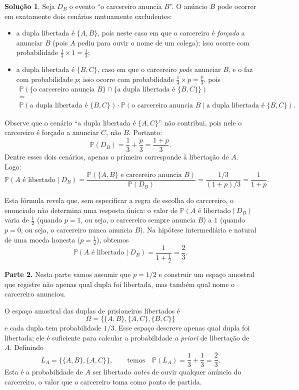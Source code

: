 \documentclass[12pt,portuguese]{article}
\theoremstyle{definition}
\newtheorem*{solution}{Solução}
\begin{document}
\begin{solution}
Seja \(D_B\) o evento ``o carcereiro anuncia \(B\)''. O anúncio \(B\) pode ocorrer em exatamente dois cenários mutuamente excludentes:
\begin{itemize}
  \item a dupla libertada é \(\{A,B\}\), pois neste caso em que o carcereiro 
  é \emph{forçado} a anunciar \(B\) (pois \(A\) pediu para ouvir o nome de um colega); isso ocorre com probabilidade \(\tfrac{1}{3} \times 1 = \tfrac{1}{3}\);
  \item a dupla libertada é \(\{B,C\}\), caso em que o carcereiro \emph{pode} anunciar \(B\), e o faz com probabilidade \(p\); isso ocorre com probabilidade \(\tfrac{1}{3} \times p = \tfrac{p}{3}\), pois
  \[
  \begin{array}{c}
  \mathbb{P}(\{\text{o carcereiro anuncia } B\} \cap \{ \text{a dupla libertada é } \{B,C\} \})
  \\
  =
  \\
  \mathbb{P}(\text{a dupla libertada é } \{B,C\})\cdot
  \mathbb{P}(\text{o carcereiro anuncia } B \mid \text{a dupla libertada é } \{B,C\}).  
  \end{array}
  \]
\end{itemize}
Observe que o cenário ``a dupla libertada é \(\{A,C\}\)'' não contribui, pois nele o carcereiro é forçado a anunciar \(C\), não \(B\). Portanto:
\[
  \mathbb{P}(D_B) = \frac{1}{3} + \frac{p}{3} = \frac{1+p}{3}.
\]
Dentre esses dois cenários, apenas o primeiro corresponde à libertação de \(A\). Logo:
\[
  \mathbb{P}(A\text{ é libertado}\mid D_B)
  = \frac{\mathbb{P}(\{A,B\} \text{ e carcereiro anuncia }B)}{\mathbb{P}(D_B)}
  = \frac{1/3}{(1+p)/3} = \frac{1}{1+p}.
\]

Esta fórmula revela que, sem especificar a regra de escolha do carcereiro, o enunciado não determina uma resposta única: o valor de \(\mathbb{P}(A\text{ é libertado}\mid D_B)\) varia de \(\tfrac{1}{2}\) (quando \(p=1\), ou seja, o carcereiro sempre anuncia \(B\)) a \(1\) (quando \(p=0\), ou seja, o carcereiro nunca anuncia \(B\)). Na hipótese intermediária e natural de uma moeda honesta (\(p=\tfrac{1}{2}\)), obtemos 
\[ 
\mathbb{P}(A\text{ é libertado}\mid D_B) = \frac{1}{1+\frac{1}{2}} = \frac{2}{3}.
\]

\smallskip
\noindent\textbf{Parte 2.} Nesta parte vamos assumir que $p=1/2$  
e construir um espaço amostral que registre não apenas 
qual dupla foi libertada, mas também qual nome o carcereiro anunciou.

O espaço amostral das duplas de prisioneiros libertados é
\[
  \Omega = \{\{A,B\}, \{A,C\}, \{B,C\}\}
\]
e cada dupla tem probabilidade $1/3$. Esse espaço descreve apenas qual dupla foi libertada; 
ele é suficiente para calcular a probabilidade \emph{a priori} de libertação de \(A\). Definindo
\[
  L_A = \{\{A,B\},\{A,C\}\},
  \qquad \text{temos}\quad  \mathbb{P}(L_A) = \frac{1}{3} + \frac{1}{3} = \frac{2}{3}.
\]
Esta é a probabilidade de \(A\) ser libertado \emph{antes} de ouvir qualquer anúncio do carcereiro, 
o valor que o carcereiro toma como ponto de partida.


\end{solution}
\end{document}

